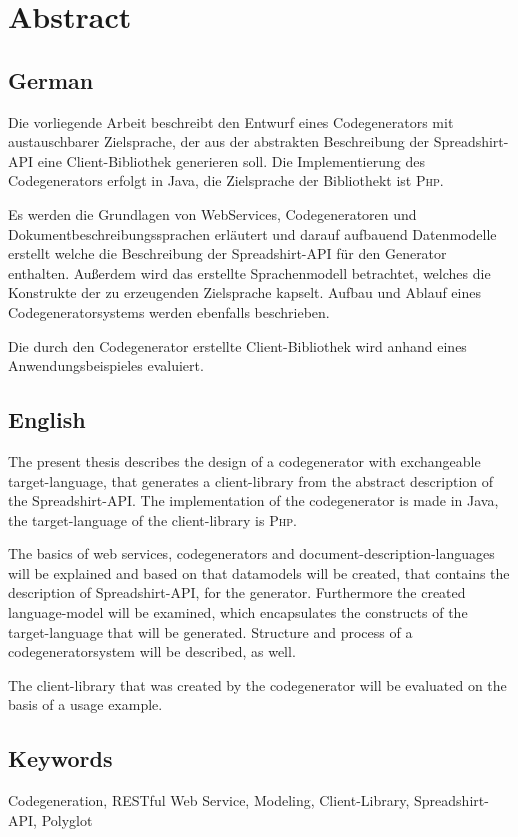 \chapter*{Abstract}



\section*{German}

Die vorliegende Arbeit beschreibt den Entwurf eines Codegenerators mit austauschbarer Zielsprache, der aus der abstrakten Beschreibung der Spreadshirt-\gls{API} eine Client-Bibliothek generieren soll. Die Implementierung des Codegenerators erfolgt in Java, die Zielsprache der Bibliothekt ist \textsc{Php}. 

Es werden die Grundlagen von WebServices, Codegeneratoren und Dokumentbeschreibungssprachen erläutert und darauf aufbauend Datenmodelle erstellt welche die Beschreibung der Spreadshirt-\gls{API} für den Generator enthalten. Außerdem wird das erstellte Sprachenmodell betrachtet, welches die Konstrukte der zu erzeugenden Zielsprache kapselt. Aufbau und Ablauf eines Codegeneratorsystems werden ebenfalls beschrieben.

Die durch den Codegenerator erstellte Client-Bibliothek wird anhand eines Anwendungsbeispieles evaluiert.

\section*{English}

The present thesis describes the design of a codegenerator with exchangeable target-language, that generates a client-library from the abstract description of the Spreadshirt-\gls{API}. The implementation of the codegenerator is made in Java, the target-language of the client-library is \textsc{Php}.

The basics of web services, codegenerators and document-description-languages will be explained and based on that datamodels will be created, that contains the description of Spreadshirt-\gls{API}, for the generator. Furthermore the created language-model will be examined, which encapsulates the constructs of the target-language that will be generated. Structure and process of a codegeneratorsystem will be described, as well.

The client-library that was created by the codegenerator will be evaluated on the basis of a usage example.

\section*{Keywords}

Codegeneration, \gls{RESTful} Web Service, Modeling, Client-Library, Spreadshirt-\gls{API}, Polyglot
\newpage